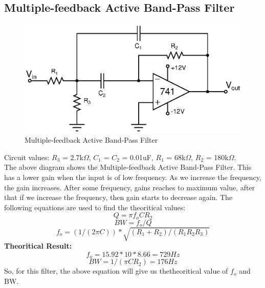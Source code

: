 \documentclass[12pt]{article}
\begin{document}
\subsection{Multiple-feedback Active Band-Pass Filter}
\begin{figure}[H]
\begin{center}
\includegraphics[scale = 0.8]{p3.eps}
\caption{Multiple-feedback Active Band-Pass Filter}
\end{center}
\end{figure}
Circuit values: $R_3$ = 2.7k$\Omega $, $C_1$ = $C_2$ = 0.01uF, $R_1$ = 68k$\Omega $, $R_2$ = 180k$\Omega $.\\
The above diagram shows the Multiple-feedback Active Band-Pass Filter. This has a lower gain when the input is of low frequency. As we increase the frequency, the gain increases. After some frequency, gains reaches to maximum value, after that if we increase the frequency, then gain starts to decrease again. The following equations are used to find the theoritical values:
\begin{equation}
   Q = \pi f_oCR_2
 \end{equation}
\begin{equation}
   BW = f_o/Q
 \end{equation}
\begin{equation}
   f_o = (1/(2\pi C)) * \sqrt{(R_1 + R_2)/(R_1R_2R_3)}
 \end{equation}
\textbf{Theoritical Result:} \\
\begin{equation}
    f_o = 15.92*10*8.66 = 729Hz
 \end{equation}
\begin{equation}
   BW = 1/(\pi CR_2) = 176Hz
 \end{equation}
So,  for this filter, the above equation will give us thetheoritical value of $f_o$ and BW.
\end{document}
